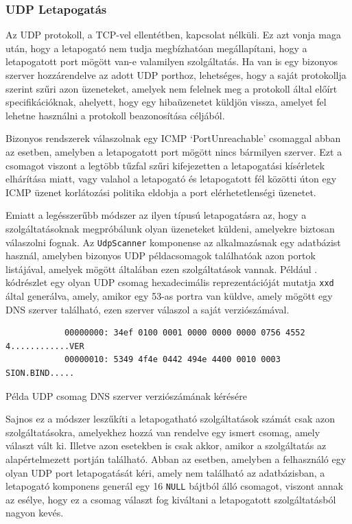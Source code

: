 \subsubsection*{UDP Letapogatás} \label{ssec:udpscan}

	Az UDP protokoll, a TCP-vel ellentétben, kapcsolat nélküli. Ez azt vonja maga után, hogy a letapogató nem tudja megbízhatóan megállapítani, hogy a letapogatott port mögött van-e valamilyen szolgáltatás. Ha van is egy bizonyos szerver hozzárendelve az adott UDP porthoz, lehetséges, hogy a saját protokollja szerint szűri azon üzeneteket, amelyek nem felelnek meg a protokoll által előírt specifikációknak, ahelyett, hogy egy hibaüzenetet küldjön vissza, amelyet fel lehetne használni a protokoll beazonosítása céljából.
	
	Bizonyos rendszerek válaszolnak egy ICMP `PortUnreachable' csomaggal abban az esetben, amelyben a letapogatott port mögött nincs bármilyen szerver. Ezt a csomagot viszont a legtöbb tűzfal szűri kifejezetten a letapogatási kísérletek elhárítása miatt, vagy valahol a letapogató és letapogatott fél közötti úton egy ICMP üzenet korlátozási politika eldobja a port elérhetetlenségi üzenetet.
	
	Emiatt a legésszerűbb módszer az ilyen típusú letapogatásra az, hogy a szolgáltatásoknak megpróbálunk olyan üzeneteket küldeni, amelyekre biztosan válaszolni fognak. Az \texttt{UdpScanner} komponense az alkalmazásnak egy adatbázist használ, amelyben bizonyos UDP példacsomagok találhatóak azon portok listájával, amelyek mögött általában ezen szolgáltatások vannak. Például \az{\ref{dnsverreq}}. kódrészlet egy olyan UDP csomag hexadecimális reprezentációját mutatja \texttt{xxd} által generálva, amely, amikor egy 53-as portra van küldve, amely mögött egy DNS szerver található, ezen szerver válaszol a saját verziószámával.

	\begin{listing}[H]
		\begin{verbatim}
			00000000: 34ef 0100 0001 0000 0000 0000 0756 4552  4............VER
			00000010: 5349 4f4e 0442 494e 4400 0010 0003       SION.BIND.....
		\end{verbatim}
		\caption{Példa UDP csomag DNS szerver verziószámának kérésére}
		\label{dnsverreq}
	\end{listing}
	
	Sajnos ez a módszer leszűkíti a letapogatható szolgáltatások számát csak azon szolgáltatásokra, amelyekhez hozzá van rendelve egy ismert csomag, amely választ vált ki. Illetve azon esetekben is csak akkor, amikor a szolgáltatás az alapértelmezett portján található. Abban az esetben, amelyben a felhasználó egy olyan UDP port letapogatását kéri, amely nem található az adatbázisban, a letapogató komponens generál egy 16 \texttt{NULL} bájtból álló csomagot, viszont annak az esélye, hogy ez a csomag választ fog kiváltani a letapogatott szolgáltatásból nagyon kevés.
	
